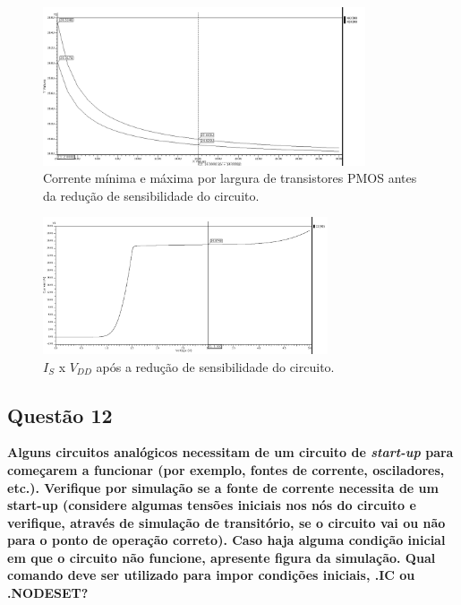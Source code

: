 \documentclass[12pt,a4paper]{article}
\begin{document}
\begin{figure}[H]
    \centering
    \includegraphics[width=0.85\textwidth]{images/corrente_maxima_minima_por_largura_de_tran.png}
    \caption{Corrente mínima e máxima por largura de transistores PMOS antes da redução de sensibilidade do circuito.}
    \label{fig:pmos_variacao}
\end{figure}

\begin{figure}[H]
    \centering
    \includegraphics[width=0.75\textwidth]{images/correnteXvdd_ajustada.png}
    \caption{$I_S$ x $V_{DD}$ após a redução de sensibilidade do circuito.}
    \label{fig:is_vdd_apos}
\end{figure}

\subsection*{Questão 12}
\begin{BoxQ}
	\textbf{Alguns circuitos analógicos necessitam de um circuito de \emph{start-up} para começarem a funcionar (por exemplo, fontes de corrente, osciladores, etc.). Verifique por simulação se a fonte de corrente necessita de um start-up (considere algumas tensões iniciais nos nós do circuito e verifique, através de simulação de transitório, se o circuito vai ou não para o ponto de operação correto). Caso haja alguma condição inicial em que o circuito não funcione, apresente figura da simulação. Qual comando deve ser utilizado para impor condições iniciais, .IC ou .NODESET?}
\end{BoxQ}
\end{document}
